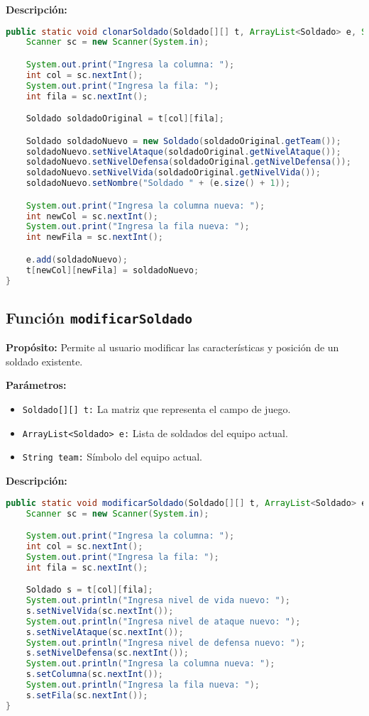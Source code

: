 \textbf{Descripción:}
\begin{lstlisting}[language=java]
public static void clonarSoldado(Soldado[][] t, ArrayList<Soldado> e, String team) {
    Scanner sc = new Scanner(System.in);

    System.out.print("Ingresa la columna: ");
    int col = sc.nextInt();
    System.out.print("Ingresa la fila: ");
    int fila = sc.nextInt();

    Soldado soldadoOriginal = t[col][fila];

    Soldado soldadoNuevo = new Soldado(soldadoOriginal.getTeam());
    soldadoNuevo.setNivelAtaque(soldadoOriginal.getNivelAtaque());
    soldadoNuevo.setNivelDefensa(soldadoOriginal.getNivelDefensa());
    soldadoNuevo.setNivelVida(soldadoOriginal.getNivelVida());
    soldadoNuevo.setNombre("Soldado " + (e.size() + 1));

    System.out.print("Ingresa la columna nueva: ");
    int newCol = sc.nextInt();
    System.out.print("Ingresa la fila nueva: ");
    int newFila = sc.nextInt();

    e.add(soldadoNuevo);
    t[newCol][newFila] = soldadoNuevo;
}
\end{lstlisting}

\subsection{Función \texttt{modificarSoldado}}

\textbf{Propósito:} Permite al usuario modificar las características y posición de un soldado existente.

\textbf{Parámetros:}
\begin{itemize}
  \item \texttt{Soldado[][] t:} La matriz que representa el campo de juego.
  \item \texttt{ArrayList<Soldado> e:} Lista de soldados del equipo actual.
  \item \texttt{String team:} Símbolo del equipo actual.
\end{itemize}

\textbf{Descripción:}
\begin{lstlisting}[language=java]
public static void modificarSoldado(Soldado[][] t, ArrayList<Soldado> e, String team) {
    Scanner sc = new Scanner(System.in);

    System.out.print("Ingresa la columna: ");
    int col = sc.nextInt();
    System.out.print("Ingresa la fila: ");
    int fila = sc.nextInt();

    Soldado s = t[col][fila];
    System.out.println("Ingresa nivel de vida nuevo: ");
    s.setNivelVida(sc.nextInt());
    System.out.println("Ingresa nivel de ataque nuevo: ");
    s.setNivelAtaque(sc.nextInt());
    System.out.println("Ingresa nivel de defensa nuevo: ");
    s.setNivelDefensa(sc.nextInt());
    System.out.println("Ingresa la columna nueva: ");
    s.setColumna(sc.nextInt());
    System.out.println("Ingresa la fila nueva: ");
    s.setFila(sc.nextInt());
}
\end{lstlisting}

